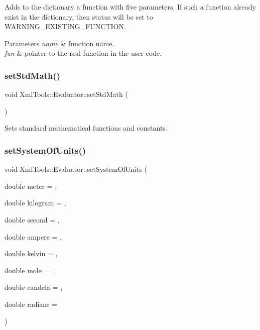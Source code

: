 Adds to the dictionary a function with five parameters. If such a function already exist in the dictionary, then status will be set to W\+A\+R\+N\+I\+N\+G\+\_\+\+E\+X\+I\+S\+T\+I\+N\+G\+\_\+\+F\+U\+N\+C\+T\+I\+ON.


\begin{DoxyParams}{Parameters}
{\em name} & function name. \\
\hline
{\em fun} & pointer to the real function in the user code. \\
\hline
\end{DoxyParams}
\hypertarget{class_xml_tools_1_1_evaluator_a5df1e3d20d6e6d9150378544d95e86b6}{}\label{class_xml_tools_1_1_evaluator_a5df1e3d20d6e6d9150378544d95e86b6} 
\subsubsection{\texorpdfstring{set\+Std\+Math()}{setStdMath()}}
{\footnotesize\ttfamily void Xml\+Tools\+::\+Evaluator\+::set\+Std\+Math (\begin{DoxyParamCaption}{ }\end{DoxyParamCaption})}

Sets standard mathematical functions and constants. \hypertarget{class_xml_tools_1_1_evaluator_a94fce6a14158fd1e9af0135268f0f68b}{}\label{class_xml_tools_1_1_evaluator_a94fce6a14158fd1e9af0135268f0f68b} 
\subsubsection{\texorpdfstring{set\+System\+Of\+Units()}{setSystemOfUnits()}}
{\footnotesize\ttfamily void Xml\+Tools\+::\+Evaluator\+::set\+System\+Of\+Units (\begin{DoxyParamCaption}\item[{double}]{meter = {},  }\item[{double}]{kilogram = {},  }\item[{double}]{second = {},  }\item[{double}]{ampere = {},  }\item[{double}]{kelvin = {},  }\item[{double}]{mole = {},  }\item[{double}]{candela = {},  }\item[{double}]{radians = {} }\end{DoxyParamCaption})}

